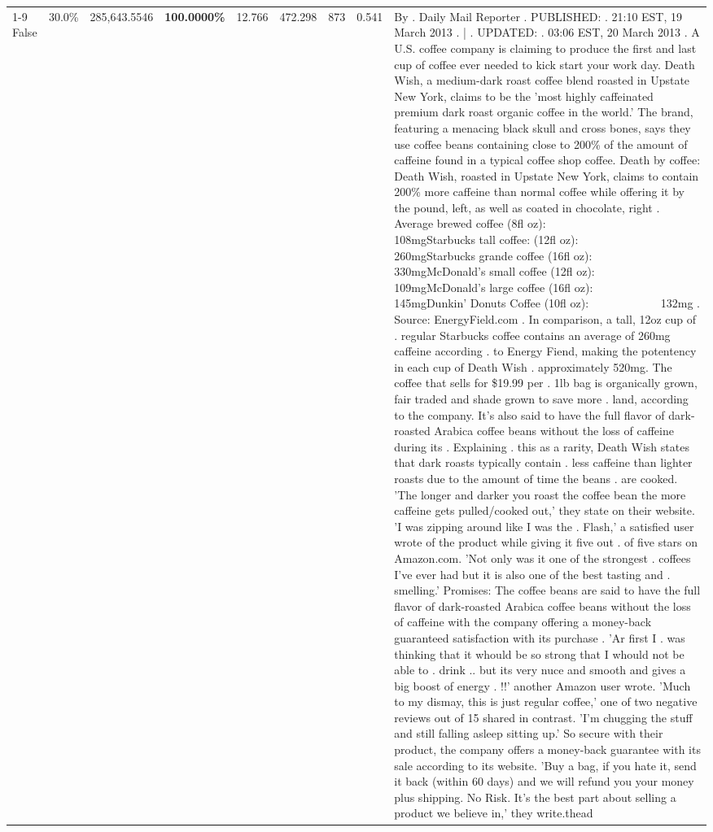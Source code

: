\begin{table}[H]
{\begin{tabular}{lllrlllll}
\cline{1-9}
False & 30.0\% & 285,643.5546 & \bfseries \color{red} 100.0000\% & 12.766 & 472.298 & 873 & 0.541 & By . Daily Mail Reporter . PUBLISHED: . 21:10 EST, 19 March 2013 . | . UPDATED: . 03:06 EST, 20 March 2013 . A U.S. coffee company is claiming to produce the first and last cup of coffee ever needed to kick start your work day. Death Wish, a medium-dark roast coffee blend roasted in Upstate New York, claims to be the 'most highly caffeinated premium dark roast organic coffee in the world.' The brand, featuring a menacing black skull and cross bones, says they use coffee beans containing close to 200\% of the amount of caffeine found in a typical coffee shop coffee. Death by coffee: Death Wish, roasted in Upstate New York, claims to contain 200\% more caffeine than normal coffee while offering it by the pound, left, as well as coated in chocolate, right . Average brewed coffee (8fl oz):              108mgStarbucks tall coffee: (12fl oz):                260mgStarbucks grande coffee (16fl oz):         330mgMcDonald's small coffee (12fl oz):           109mgMcDonald's large coffee (16fl oz):           145mgDunkin' Donuts Coffee (10fl oz):             132mg . Source: EnergyField.com . In comparison, a tall, 12oz cup of . regular Starbucks coffee contains an average of 260mg caffeine according . to Energy Fiend, making the potentency in each cup of Death Wish . approximately 520mg. The coffee that sells for \$19.99 per . 1lb bag is organically grown, fair traded and shade grown to save more . land, according to the company. It's also said to have the full flavor of dark-roasted Arabica coffee beans without the loss of caffeine during its . Explaining . this as a rarity, Death Wish states that dark roasts typically contain . less caffeine than lighter roasts due to the amount of time the beans . are cooked. 'The longer and darker you roast the coffee bean the more caffeine gets pulled/cooked out,' they state on their website. 'I was zipping around like I was the . Flash,' a satisfied user wrote of the product while giving it five out . of five stars on Amazon.com. 'Not only was it one of the strongest . coffees I've ever had but it is also one of the best tasting and . smelling.’ Promises: The coffee beans are said to have the full flavor of dark-roasted Arabica coffee beans without the loss of caffeine with the company offering a money-back guaranteed satisfaction with its purchase . 'Ar first I . was thinking that it whould be so strong that I whould not be able to . drink .. but its very nuce and smooth and gives a big boost of energy . !!' another Amazon user wrote. 'Much to my dismay, this is just regular coffee,' one of two negative reviews out of 15 shared in contrast. 'I'm chugging the stuff and still falling asleep sitting up.' So secure with their product, the company offers a money-back guarantee with its sale according to its website. 'Buy a bag, if you hate it, send it back (within 60 days) and we will refund you your money plus shipping. No Risk. It’s the best part about selling a product we believe in,' they write.thead \\

\end{tabular}}
\end{table}
